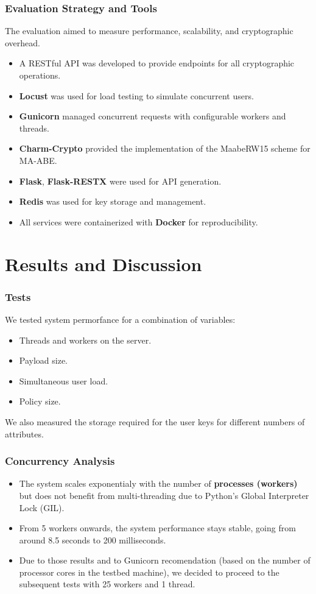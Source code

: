 \documentclass{beamer}
\begin{document}
\begin{frame}
    \frametitle{Evaluation Strategy and Tools}
    The evaluation aimed to measure performance, scalability, and cryptographic overhead.
    \begin{itemize}
        \item A RESTful API was developed to provide endpoints for all cryptographic operations.
        \item \textbf{Locust} was used for load testing to simulate concurrent users.
        \item \textbf{Gunicorn} managed concurrent requests with configurable workers and threads.
        \item \textbf{Charm-Crypto} provided the implementation of the MaabeRW15 scheme for MA-ABE.
        \item \textbf{Flask}, \textbf{Flask-RESTX} were used for API generation.
        \item \textbf{Redis} was used for key storage and management.
        \item All services were containerized with \textbf{Docker} for reproducibility.
    \end{itemize}
\end{frame}

\section{Results and Discussion}

\begin{frame}
    \frametitle{Tests}
    We tested system permorfance for a combination of variables:
    \begin{itemize}
        \item Threads and workers on the server.
        \item Payload size.
        \item Simultaneous user load.
        \item Policy size.
    \end{itemize}

    We also measured the storage required for the user keys for different numbers of attributes.
\end{frame}

\begin{frame}
    \frametitle{Concurrency Analysis}
    \begin{itemize}
        \item The system scales exponentialy with the number of \textbf{processes (workers)} but does not benefit from multi-threading due to Python's Global Interpreter Lock (GIL).
        \item From 5 workers onwards, the system performance stays stable, going from around 8.5 seconds to 200 milliseconds.
        \item Due to those results and to Gunicorn recomendation (based on the number of processor cores in the testbed machine), we decided to proceed to the subsequent tests with 25 workers and 1 thread.
    \end{itemize}
\end{frame}
\end{document}
